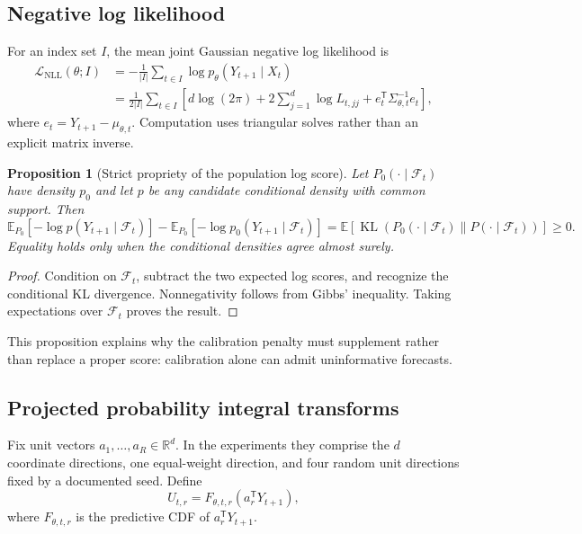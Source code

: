 \documentclass[11pt]{article}
\newtheorem{proposition}[definition]{Proposition}
\newcommand{\R}{\mathbb{R}}
\newcommand{\E}{\mathbb{E}}
\newcommand{\F}{\mathcal{F}}
\newcommand{\KL}{\operatorname{KL}}
\begin{document}
\subsection{Negative log likelihood}

For an index set $I$, the mean joint Gaussian negative log likelihood is
\begin{align}
\mathcal L_{\mathrm{NLL}}(\theta;I)
&=-\frac{1}{|I|}\sum_{t\in I}
\log p_\theta(Y_{t+1}\mid X_t) \\
&=\frac{1}{2|I|}\sum_{t\in I}
\left[
d\log(2\pi)+2\sum_{j=1}^d\log L_{t,jj}
+e_t^{\mathsf T}\Sigma_{\theta,t}^{-1}e_t
\right],
\label{eq:nll}
\end{align}
where $e_t=Y_{t+1}-\mu_{\theta,t}$. Computation uses triangular solves rather
than an explicit matrix inverse.

\begin{proposition}[Strict propriety of the population log score]
Let $P_0(\cdot\mid\F_t)$ have density $p_0$ and let $p$ be any candidate
conditional density with common support. Then
\[
\E_{P_0}[-\log p(Y_{t+1}\mid\F_t)]
-\E_{P_0}[-\log p_0(Y_{t+1}\mid\F_t)]
=\E\!\left[\KL(P_0(\cdot\mid\F_t)\|P(\cdot\mid\F_t))\right]\geq0.
\]
Equality holds only when the conditional densities agree almost surely.
\end{proposition}

\begin{proof}
Condition on $\F_t$, subtract the two expected log scores, and recognize the
conditional KL divergence. Nonnegativity follows from Gibbs' inequality. Taking
expectations over $\F_t$ proves the result.
\end{proof}

This proposition explains why the calibration penalty must supplement rather than
replace a proper score: calibration alone can admit uninformative forecasts.

\subsection{Projected probability integral transforms}

Fix unit vectors $a_1,\ldots,a_R\in\R^d$. In the experiments they comprise the
$d$ coordinate directions, one equal-weight direction, and four random unit
directions fixed by a documented seed. Define
\begin{equation}
U_{t,r}=F_{\theta,t,r}(a_r^{\mathsf T}Y_{t+1}),
\label{eq:pit}
\end{equation}
where $F_{\theta,t,r}$ is the predictive CDF of $a_r^{\mathsf T}Y_{t+1}$.
\end{document}
